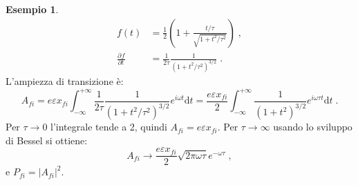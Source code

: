 \documentclass[12pt,a4paper]{report}
\theoremstyle{definition}
\newtheorem{exm}{Esempio}
\newcommand{\pdev}[3][]{\frac{\partial^{#1} #2}{\partial #3^{#1}}}
\numberwithin{equation}{section}
\newcommand{\diff}[1][]{\mathrm{d}#1}
\begin{document}
\begin{exm}
\begin{align*}
f(t)&=\frac{1}{2}\left(1+\frac{t/\tau}{\sqrt{1+t^2/\tau^2}}\right)\;, \\
\pdev{f}{t} &= \frac{1}{2\tau}\frac{1}{(1+t^2/\tau^2)^{3/2}}\;.
\end{align*}
L'ampiezza di transizione è:
\begin{equation*}
A_{fi}=e\varepsilon x_{fi}\int_{-\infty}^{+\infty} \frac{1}{2\tau}\frac{1}{(1+t^2/\tau^2)^{3/2}}e^{i\omega t}\diff{t}=\frac{e\varepsilon x_{fi}}{2}\int_{-\infty}^{+\infty}\frac{1}{(1+t^2)^{3/2}}e^{i\omega\tau t}\diff{t}\;.
\end{equation*}
Per $\tau\to 0$ l'integrale tende a 2, quindi $A_{fi}=e\varepsilon x_{fi}$. Per $\tau\to\infty$ usando lo sviluppo di Bessel si ottiene:
\begin{equation*}
A_{fi}\to \frac{e\varepsilon x_{fi}}{2}\sqrt{2\pi\omega\tau}e^{-\omega\tau}\;,
\end{equation*}
e $P_{fi}=|A_{fi}|^2$.
\end{exm}
\end{document}
